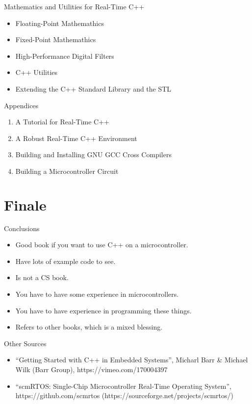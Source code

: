 \documentclass{beamer}
\begin{document}
\begin{frame}{Mathematics and Utilities for Real-Time C++}
  \begin{itemize}
  \item Floating-Point Mathemathics
  \item Fixed-Point Mathemathics
  \item High-Performance Digital Filters
  \item C++ Utilities
  \item Extending the C++ Standard Library and the STL
  \end{itemize}
\end{frame}

\begin{frame}{Appendices}
  \begin{enumerate}[A]
  \item A Tutorial for Real-Time C++
  \item A Robust Real-Time C++ Environment
  \item Building and Installing GNU GCC Cross Compilers
  \item Building a Microcontroller Circuit
  \end{enumerate}
\end{frame}



\section{Finale}

\begin{frame}{Conclusions}
\begin{itemize}
\item Good book if you want to use C++ on a microcontroller.
  \pause \item Have lots of example code to see.
  \pause \item Is not a CS book.
  \pause\item You have to have some experience in microcontrollers.
  \pause \item You have to have experience in programming these things.
  \pause \item Refers to other books, which is a mixed blessing.
\end{itemize}
\end{frame}

\begin{frame}{Other Sources}
  \begin{itemize}
  \item ``Getting Started with C++ in Embedded Systems'',
    Micharl Barr \& Michael Wilk (Barr Group), https://vimeo.com/170004397
  \item ``scmRTOS: Single-Chip Microcontroller Real-Time Operating System'',
    https://github.com/scmrtos (https://sourceforge.net/projects/scmrtos/)
  \end{itemize}
\end{frame}
\end{document}
